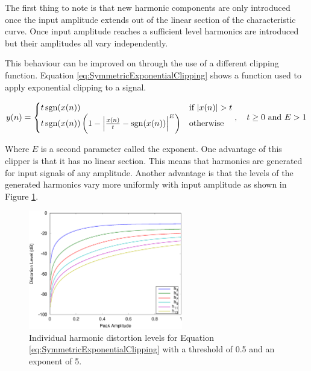 			The first thing to note is that new harmonic components are only introduced once the input
			amplitude extends out of the linear section of the characteristic curve. Once input amplitude
			reaches a sufficient level harmonics are introduced but their amplitudes all vary independently.

			This behaviour can be improved on through the use of a different clipping function. Equation
			\ref{eq:SymmetricExponentialClipping} shows a function used to apply exponential clipping to a
			signal.
			
			\begin{equation}
				y(n) = \begin{cases}
					t\operatorname{sgn}(x(n)) & \text{if $|x(n)| > t$} \\
					t\operatorname{sgn}(x(n)) \left(1 - \left|\frac{x(n)}{t} - \operatorname{sgn}(x(n)) \right|^{E} \right) &
						\text{otherwise}
				\end{cases}, \quad t \geq 0 \ \text{and} \ E > 1
				\label{eq:SymmetricExponentialClipping}
			\end{equation}

			Where $E$ is a second parameter called the exponent. One advantage of this clipper is that it has
			no linear section. This means that harmonics are generated for input signals of any amplitude.
			Another advantage is that the levels of the generated harmonics vary more uniformly with input
			amplitude as shown in Figure \ref{fig:ExponentialClippingHarmonics}.

			\begin{figure}[h!]
				\centering
				\includegraphics[width=0.6\textwidth]{chapter3/Images/ExponentialClippingHarmonics.eps}
				\caption{Individual harmonic distortion levels for Equation
					 \ref{eq:SymmetricExponentialClipping} with a threshold of 0.5 and an 
				         exponent of 5.}
				\label{fig:ExponentialClippingHarmonics}
			\end{figure}

